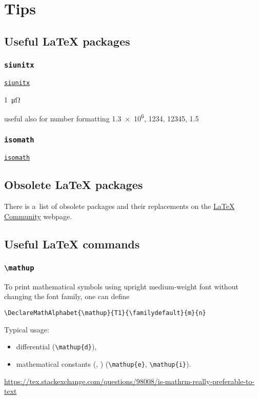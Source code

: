\documentclass[12pt,a4paper]{article}
\begin{document}
\section{Tips}

\cite{vieth-experience}
\cite{latex-short,latex-tabu,latex-tips,latex-dos-donts,latex-wikibook}

\subsection{Useful \LaTeX{} packages}

\subsubsection{\texttt{siunitx}}

\href{https://ctan.org/pkg/siunitx}{\texttt{siunitx}}

\qty{1}{\micro\ohm}

useful also for number formatting \num{1.3e6}, \num{1234}, \num{12345}, \num{1,5}

\subsubsection{\texttt{isomath}}

\href{https://ctan.org/pkg/isomath}{\texttt{isomath}}

\subsection{Obsolete \LaTeX{} packages}

There is a~list of obsolete packages and their replacements on the \href{https://latex.org/forum/viewtopic.php?t=6637}{\LaTeX{} Community} webpage.

\subsection{Useful \LaTeX{} commands}

\cprotect\subsubsection{\verb_\mathup_}
\label{sec:mathup}

To print mathematical symbols using upright medium-weight font without changing the font family, one can define
\begin{verbatim}
\DeclareMathAlphabet{\mathup}{T1}{\familydefault}{m}{n}
\end{verbatim}
Typical usage:
\begin{itemize}
\item differential  (\verb_\mathup{d}_),
\item mathematical constants (, ) (\verb_\mathup{e}_, \verb_\mathup{i}_).
\end{itemize}
\url{https://tex.stackexchange.com/questions/98008/is-mathrm-really-preferable-to-text}
\end{document}
